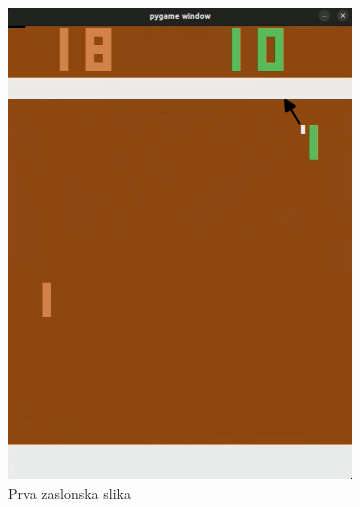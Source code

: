 \documentclass[cover]{thesis}
\begin{document}
\begin{figure}[H]
    \begin{subfigure}{0.495\linewidth}
        \centering
        \includegraphics[width=\textwidth]{AttackStrategy.png}
        \caption{Prva zaslonska slika}\label{fig:odbojLoparja}
    \end{subfigure}
    \begin{subfigure}{0.495\linewidth}
        \centering

\end{subfigure}
\end{figure}
\end{document}
